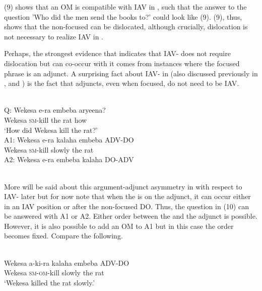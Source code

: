 \documentclass[output=paper
,newtxmath
,modfonts
,nonflat]{langsci/langscibook}
\begin{document}
(9) shows that an OM is compatible with IAV  in , such that the answer to the question 'Who did the men send the books to?' could look like (9). (9), thus, shows that the non-focused  can be dislocated, although crucially, dislocation is not necessary to realize IAV  in .

Perhaps, the strongest evidence that indicates that  IAV- does not require dislocation but can co-occur with it comes from instances where the focused phrase is an adjunct. A surprising fact about IAV- in  (also discussed previously in \citet{Carstens2013}, and \citet{safirforthcoming}) is the fact that  adjuncts, even when focused, do not need to be IAV.

\ea\label{ex:selvanathan:10}
\\

Q: \gll Wekesa   e-ra     embeba   aryeena? \\
	Wekesa   \textsc{sm}{}-kill   {the rat}    how \\
\glt \-\hspace{0.5cm}`How did Wekesa kill the rat?' \\

A1: \gll Wekesa    e-ra   kalaha   embeba ADV-DO \\
Wekesa   \textsc{sm}{}-kill   slowly    {the rat} \\

A2: \gll Wekesa    e-ra   embeba   kalaha   DO-ADV\\
\\
\z

More will be said about this argument-adjunct asymmetry in  with respect to IAV- later but for now note that when the  is on the adjunct, it can occur either in an IAV position or after the non-focused DO. Thus, the question in (10) can be answered with A1 or A2. Either order between the  and the adjunct is possible. However, it is also possible to add an OM to A1 but in this case the order becomes fixed. Compare the following.

\ea\label{ex:selvanathan:11}
\\
\ea\label{ex:selvanathan:11a}
\gll Wekesa  a-ki-ra   kalaha   embeba  ADV-DO\\
Wekesa  \textsc{sm}{}-\textsc{om}{}-kill  slowly    {the rat}\\
\glt `Wekesa killed the rat slowly.' 
\end{document}
